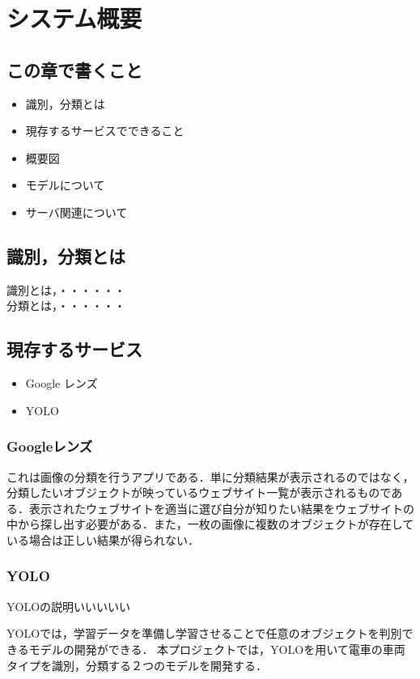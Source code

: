 

\chapter{システム概要}
\section{この章で書くこと}
\begin{itemize}
	\item 識別，分類とは
	\item 現存するサービスでできること
	\item 概要図
	\item モデルについて
	\item サーバ関連について
\end{itemize}
\section{識別，分類とは}
識別とは，・・・・・・\\
分類とは，・・・・・・
\section{現存するサービス}
\begin{itemize}
	\item Google レンズ
	\item YOLO
\end{itemize}

\subsection{Googleレンズ}\label{google-service}
これは画像の分類を行うアプリである．単に分類結果が表示されるのではなく，分類したいオブジェクトが映っているウェブサイト一覧が表示されるものである．表示されたウェブサイトを適当に選び自分が知りたい結果をウェブサイトの中から探し出す必要がある．また，一枚の画像に複数のオブジェクトが存在している場合は正しい結果が得られない．

\subsection{YOLO}\label{YOLO-service}
YOLOの説明いいいいい

YOLOでは，学習データを準備し学習させることで任意のオブジェクトを判別できるモデルの開発ができる．
本プロジェクトでは，YOLOを用いて電車の車両タイプを識別，分類する２つのモデルを開発する．
